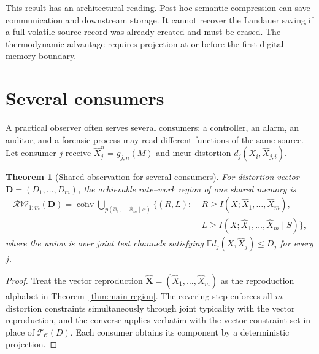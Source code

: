 \documentclass[letterpaper,onecolumn]{IEEEtran}
\newtheorem{theorem}{Theorem}
\theoremstyle{definition}
\theoremstyle{remark}
\newcommand{\E}{\mathbb{E}}
\newcommand{\cC}{\mathcal{C}}
\newcommand{\RW}{\mathcal{R}\!\mathcal{W}}
\newcommand{\clconv}{\overline{\operatorname{conv}}}
\newcommand{\1}{\mathbf{1}}
\begin{document}
This result has an architectural reading. Post-hoc semantic compression can
save communication and downstream storage. It cannot recover the Landauer
saving if a full volatile source record was already created and must be erased.
The thermodynamic advantage requires projection at or before the first digital
memory boundary.

\section{Several consumers}\label{sec:multi}

A practical observer often serves several consumers: a controller, an alarm, an
auditor, and a forensic process may read different functions of the same source.
Let consumer $j$ receive $\widehat X_j^n=g_{j,n}(M)$ and incur distortion
$d_j(X_i,\widehat X_{j,i})$.

\begin{theorem}[Shared observation for several consumers]\label{thm:multi}
For distortion vector $\bm D=(D_1,\ldots,D_m)$, the achievable rate--work region
of one shared memory is
\begin{equation}
\begin{split}
 \RW_{1:m}(\bm D)
 =\clconv\!\bigcup_{p(\hat x_1,\ldots,\hat x_m\mid x)}
 \bigl\{(R,L):\;&R\ge I(X;\widehat X_1,\ldots,\widehat X_m),\\
 &L\ge I(X;\widehat X_1,\ldots,\widehat X_m\mid S)\bigr\},
 \label{eq:multi-region}
\end{split}
\end{equation}
where the union is over joint test channels satisfying
$\E d_j(X,\widehat X_j)\le D_j$ for every $j$.
\end{theorem}

\begin{proof}
Treat the vector reproduction
$\widehat{\bm X}=(\widehat X_1,\ldots,\widehat X_m)$ as the reproduction alphabet
in Theorem~\ref{thm:main-region}. The covering step enforces all $m$ distortion
constraints simultaneously through joint typicality with the vector
reproduction, and the converse applies verbatim with the vector constraint set
in place of $\mathcal T_{\cC}(D)$. Each consumer obtains its component by a
deterministic projection.
\end{proof}
\end{document}
